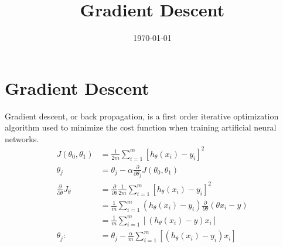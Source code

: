 \documentclass[a4paper, 12pt]{article}
\begin{document}
\title{Gradient Descent}
\date{\today}
\pagestyle{empty} 
\section*{Gradient Descent}
	Gradient descent, or back propagation, is a first order iterative optimization algorithm used to minimize the cost function when training artificial neural networks.
\begin{align*}
J(\theta_0, \theta_1) &= \frac{1}{2m} \sum_{i=1}^{m} [h_\theta (x_i) - y_i]^2 \\ 
\theta_j &= \theta_j - \alpha \frac{\partial}{\partial \theta_j} J(\theta_0, \theta_1) \\
\frac{\partial}{\partial \theta} J_\theta &= \frac{\partial}{\partial \theta} \frac{1}{2m} \sum_{i=1}^{m} [h_\theta (x_i) - y_i]^2 \\
&= \frac{1}{m} \sum_{i=1}^{m} (h_\theta (x_i) - y_i) \frac{\partial}{\partial \theta} (\theta x_i - y) \\
&= \frac{1}{m} \sum_{i=1}^{m} [(h_\theta (x_i) - y) x_i] \\
\theta_j :&= \theta_j - \frac{\alpha}{m} \sum_{i=1}^{m}[(h_\theta(x_i) - y_i) x_i]
\end{align*}

	
\end{document}
